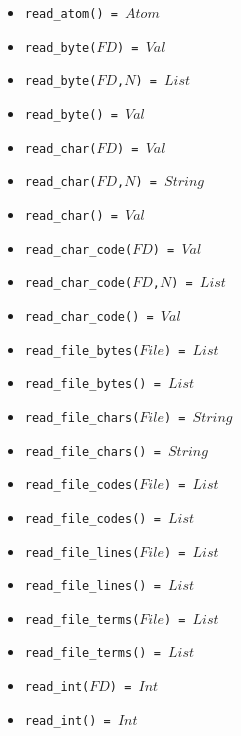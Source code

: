 \documentclass[10pt]{article}
\begin{document}
\begin{multicols}{2}
\begin{scriptsize}
\begin{itemize}
   \item \texttt{read\_atom() = $Atom$}
   \item \texttt{read\_byte($FD$) = $Val$}
   \item \texttt{read\_byte($FD$,$N$) = $List$}
   \item \texttt{read\_byte() = $Val$}
   \item \texttt{read\_char($FD$) = $Val$}
   \item \texttt{read\_char($FD$,$N$) = $String$}
   \item \texttt{read\_char() = $Val$}
   \item \texttt{read\_char\_code($FD$) = $Val$}
   \item \texttt{read\_char\_code($FD$,$N$) = $List$}
   \item \texttt{read\_char\_code() = $Val$}
   \item \texttt{read\_file\_bytes($File$) = $List$}
   \item \texttt{read\_file\_bytes() = $List$}
   \item \texttt{read\_file\_chars($File$) = $String$}
   \item \texttt{read\_file\_chars() = $String$}
   \item \texttt{read\_file\_codes($File$) = $List$}
   \item \texttt{read\_file\_codes() = $List$}
   \item \texttt{read\_file\_lines($File$) = $List$}
   \item \texttt{read\_file\_lines() = $List$}
   \item \texttt{read\_file\_terms($File$) = $List$}
   \item \texttt{read\_file\_terms() = $List$}
   \item \texttt{read\_int($FD$) = $Int$}
   \item \texttt{read\_int() = $Int$}

\end{itemize}
\end{scriptsize}
\end{multicols}
\end{document}
